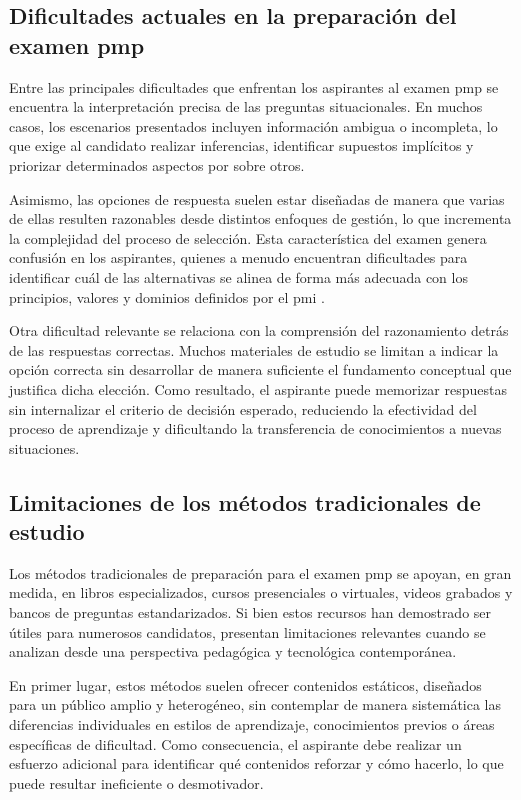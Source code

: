 \subsection{Dificultades actuales en la preparación del examen \gls{pmp}}

Entre las principales dificultades que enfrentan los aspirantes al examen \gls{pmp} se encuentra la interpretación precisa de las preguntas situacionales. En muchos casos, los escenarios presentados incluyen información ambigua o incompleta, lo que exige al candidato realizar inferencias, identificar supuestos implícitos y priorizar determinados aspectos por sobre otros.

Asimismo, las opciones de respuesta suelen estar diseñadas de manera que varias de ellas resulten razonables desde distintos enfoques de gestión, lo que incrementa la complejidad del proceso de selección. Esta característica del examen genera confusión en los aspirantes, quienes a menudo encuentran dificultades para identificar cuál de las alternativas se alinea de forma más adecuada con los principios, valores y dominios definidos por el \gls{pmi} \parencite{pmi2021handbook}.

Otra dificultad relevante se relaciona con la comprensión del razonamiento detrás de las respuestas correctas. Muchos materiales de estudio se limitan a indicar la opción correcta sin desarrollar de manera suficiente el fundamento conceptual que justifica dicha elección. Como resultado, el aspirante puede memorizar respuestas sin internalizar el criterio de decisión esperado, reduciendo la efectividad del proceso de aprendizaje y dificultando la transferencia de conocimientos a nuevas situaciones.

\subsection{Limitaciones de los métodos tradicionales de estudio}

Los métodos tradicionales de preparación para el examen \gls{pmp} se apoyan, en gran medida, en libros especializados, cursos presenciales o virtuales, videos grabados y bancos de preguntas estandarizados. Si bien estos recursos han demostrado ser útiles para numerosos candidatos, presentan limitaciones relevantes cuando se analizan desde una perspectiva pedagógica y tecnológica contemporánea.

En primer lugar, estos métodos suelen ofrecer contenidos estáticos, diseñados para un público amplio y heterogéneo, sin contemplar de manera sistemática las diferencias individuales en estilos de aprendizaje, conocimientos previos o áreas específicas de dificultad. Como consecuencia, el aspirante debe realizar un esfuerzo adicional para identificar qué contenidos reforzar y cómo hacerlo, lo que puede resultar ineficiente o desmotivador.

